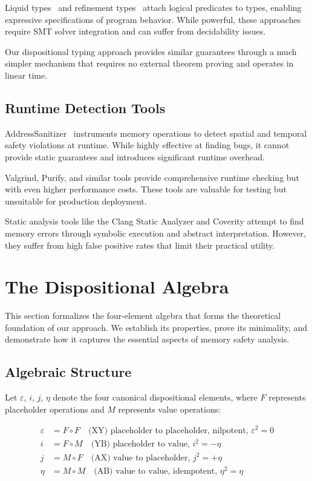 \documentclass[journal]{IEEEtran}
\begin{document}
Liquid types~\cite{rondon2008liquid} and refinement types~\cite{vazou2014refinement} attach logical predicates to types, enabling expressive specifications of program behavior. While powerful, these approaches require SMT solver integration and can suffer from decidability issues.

Our dispositional typing approach provides similar guarantees through a much simpler mechanism that requires no external theorem proving and operates in linear time.

\subsection{Runtime Detection Tools}

AddressSanitizer~\cite{serebryany2012addresssanitizer} instruments memory operations to detect spatial and temporal safety violations at runtime. While highly effective at finding bugs, it cannot provide static guarantees and introduces significant runtime overhead.

Valgrind, Purify, and similar tools provide comprehensive runtime checking but with even higher performance costs. These tools are valuable for testing but unsuitable for production deployment.

Static analysis tools like the Clang Static Analyzer and Coverity attempt to find memory errors through symbolic execution and abstract interpretation. However, they suffer from high false positive rates that limit their practical utility.

\section{The Dispositional Algebra}
\label{sec:algebra}

This section formalizes the four-element algebra that forms the theoretical foundation of our approach. We establish its properties, prove its minimality, and demonstrate how it captures the essential aspects of memory safety analysis.

\subsection{Algebraic Structure}

Let $\varepsilon$, $i$, $j$, $\eta$ denote the four canonical dispositional elements, where $F$ represents placeholder operations and $M$ represents value operations:

\begin{align}
\varepsilon &= F \circ F \quad \text{(XY) placeholder to placeholder, nilpotent, } \varepsilon^2 = 0 \\
i &= F \circ M \quad \text{(YB) placeholder to value, } i^2 = -\eta \\
j &= M \circ F \quad \text{(AX) value to placeholder, } j^2 = +\eta \\
\eta &= M \circ M \quad \text{(AB) value to value, idempotent, } \eta^2 = \eta
\end{align}
\end{document}
